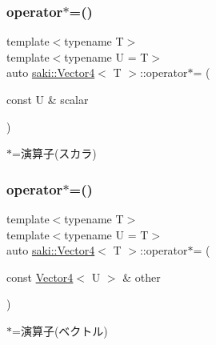 \subsubsection{\texorpdfstring{operator$\ast$=()}{operator*=()}\hspace{0.1cm}{\footnotesize\ttfamily [1/2]}}
{\footnotesize\ttfamily template$<$typename T$>$ \\
template$<$typename U  = T$>$ \\
auto \mbox{\hyperlink{classsaki_1_1_vector4}{saki\+::\+Vector4}}$<$ T $>$\+::operator$\ast$= (\begin{DoxyParamCaption}\item[{const U \&}]{scalar }\end{DoxyParamCaption})\hspace{0.3cm}{\ttfamily [inline]}}



$\ast$=演算子(スカラ) 

\mbox{\label{classsaki_1_1_vector4_a306c8e4f9d6318d7106239ca74613100}} 
\subsubsection{\texorpdfstring{operator$\ast$=()}{operator*=()}\hspace{0.1cm}{\footnotesize\ttfamily [2/2]}}
{\footnotesize\ttfamily template$<$typename T$>$ \\
template$<$typename U  = T$>$ \\
auto \mbox{\hyperlink{classsaki_1_1_vector4}{saki\+::\+Vector4}}$<$ T $>$\+::operator$\ast$= (\begin{DoxyParamCaption}\item[{const \mbox{\hyperlink{classsaki_1_1_vector4}{Vector4}}$<$ U $>$ \&}]{other }\end{DoxyParamCaption})\hspace{0.3cm}{\ttfamily [inline]}}



$\ast$=演算子(ベクトル) 

\mbox{\label{classsaki_1_1_vector4_a566780780cb2a9fabd895273038f7464}} 
